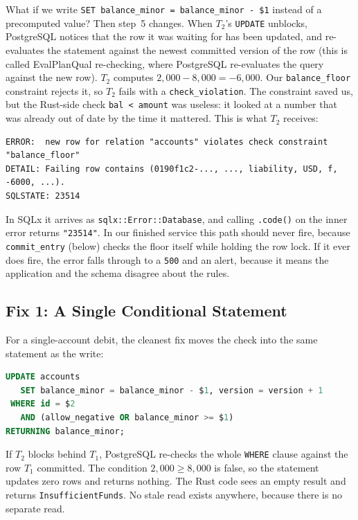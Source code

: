 What if we write \texttt{SET balance\_minor = balance\_minor - \$1} instead of a precomputed value? Then step~5 changes. When $T_2$'s \texttt{UPDATE} unblocks, PostgreSQL notices that the row it was waiting for has been updated, and re-evaluates the statement against the newest committed version of the row (this is called EvalPlanQual re-checking, where PostgreSQL re-evaluates the query against the new row). $T_2$ computes $2{,}000 - 8{,}000 = -6{,}000$. Our \texttt{balance\_floor} constraint rejects it, so $T_2$ fails with a \texttt{check\_violation}. The constraint saved us, but the Rust-side check \texttt{bal < amount} was useless: it looked at a number that was already out of date by the time it mattered. This is what $T_2$ receives:
\begin{lstlisting}[language=Plain]
ERROR:  new row for relation "accounts" violates check constraint "balance_floor"
DETAIL: Failing row contains (0190f1c2-..., ..., liability, USD, f, -6000, ...).
SQLSTATE: 23514
\end{lstlisting}
In SQLx it arrives as \texttt{sqlx::Error::Database}, and calling \texttt{.code()} on the inner error returns \texttt{"23514"}. In our finished service this path should never fire, because \texttt{commit\_entry} (below) checks the floor itself while holding the row lock. If it ever does fire, the error falls through to a \texttt{500} and an alert, because it means the application and the schema disagree about the rules.

\subsection{Fix 1: A Single Conditional Statement}

For a single-account debit, the cleanest fix moves the check into the same statement as the write:

\begin{lstlisting}[language=SQL]
UPDATE accounts
   SET balance_minor = balance_minor - $1, version = version + 1
 WHERE id = $2
   AND (allow_negative OR balance_minor >= $1)
RETURNING balance_minor;
\end{lstlisting}

If $T_2$ blocks behind $T_1$, PostgreSQL re-checks the whole \texttt{WHERE} clause against the row $T_1$ committed. The condition $2{,}000 \ge 8{,}000$ is false, so the statement updates zero rows and returns nothing. The Rust code sees an empty result and returns \texttt{InsufficientFunds}. No stale read exists anywhere, because there is no separate read.

